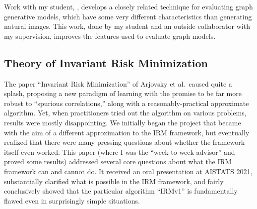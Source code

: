 \documentclass[12pt]{article}
\begin{document}
Work with my student, \cite{shirzad:contrastive-graph-eval}, develops a closely related technique for evaluating graph generative models, which have some very different characteristics than generating natural images. This work, done by my student and an outside collaborator with my supervision, improves the features used to evaluate graph models.


\subsection{Theory of Invariant Risk Minimization} \label{sec:irm}
The paper ``Invariant Risk Minimization'' of Arjovsky et al.\ caused quite a splash, proposing a new paradigm of learning with the promise to be far more robust to ``spurious correlations,'' along with a reasonably-practical approximate algorithm. Yet, when practitioners tried out the algorithm on various problems, results were mostly disappointing. We initially began the project that became \cite{kamath:irm} with the aim of a different approximation to the IRM framework, but eventually realized that there were many pressing questions about whether the framework itself even worked. This paper (where I was the ``week-to-week advisor'' and proved some results) addressed several core questions about what the IRM framework can and cannot do. It received an oral presentation at AISTATS 2021, substantially clarified what is possible in the IRM framework, and fairly conclusively showed that the particular algorithm ``IRMv1'' is fundamentally flawed even in surprisingly simple situations.


% 
% 
\end{document}
